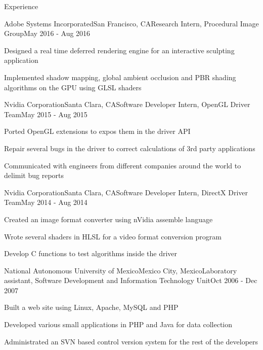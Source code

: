 \documentclass{resume} %
\begin{document}

\begin{rSection}{Experience}

\begin{rSubsection}{Adobe Systems Incorporated}{San Francisco, CA}{Research Intern, Procedural Image Group}{May 2016 - Aug 2016}
\item Designed a real time deferred rendering engine for an interactive sculpting application
\item Implemented shadow mapping, global ambient occlusion and PBR shading algorithms on the GPU using GLSL shaders
\end{rSubsection}

\begin{rSubsection}{Nvidia Corporation}{Santa Clara, CA}{Software Developer Intern, OpenGL Driver Team}{May 2015 - Aug 2015}
\item Ported OpenGL extensions to expos them in the driver API
\item Repair several bugs in the driver to correct calculations of 3rd party applications
\item Communicated with engineers from different companies around the world to delimit bug reports
\end{rSubsection}

\begin{rSubsection}{Nvidia Corporation}{Santa Clara, CA}{Software Developer Intern, DirectX Driver Team}{May 2014 - Aug 2014}
\item Created an image format converter using nVidia assemble language
\item Wrote several shaders in HLSL for a video format conversion program
\item Develop C functions to test algorithms inside the driver
\end{rSubsection}

\begin{rSubsection}{National Autonomous University of Mexico}{Mexico City, Mexico}{Laboratory assistant, Software Development and Information Technology Unit}{Oct 2006 - Dec 2007}
\item Built a web site using Linux, Apache, MySQL and PHP
\item Developed various small applications in PHP and Java for data collection
\item Administrated an SVN based control version system for the rest of the developers
\end{rSubsection}


\end{rSection}
\end{document}
